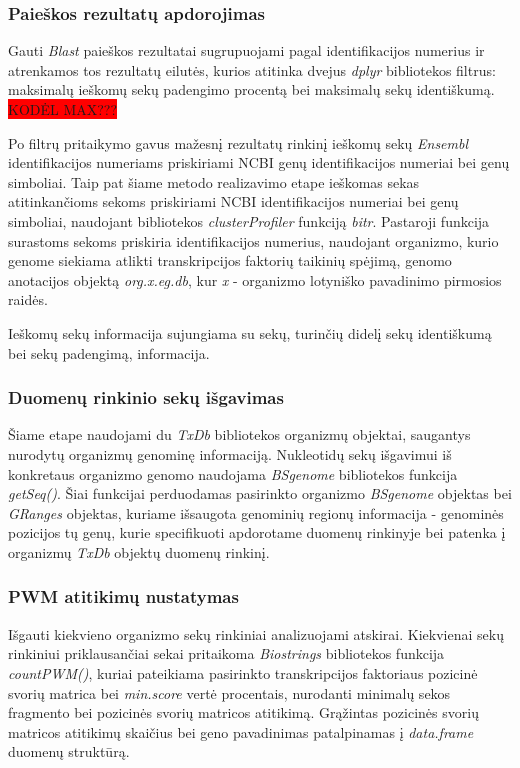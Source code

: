 \documentclass[12pt]{article}
\begin{document}
\subsubsection{Paieškos rezultatų apdorojimas}
Gauti \emph{Blast} paieškos rezultatai sugrupuojami pagal identifikacijos
numerius ir atrenkamos tos rezultatų eilutės, kurios atitinka dvejus
\emph{dplyr} bibliotekos filtrus: maksimalų ieškomų sekų padengimo procentą bei
maksimalų sekų identiškumą. \colorbox{red}{KODĖL MAX???}

Po filtrų pritaikymo gavus mažesnį rezultatų rinkinį ieškomų sekų \emph{Ensembl}
identifikacijos numeriams priskiriami NCBI genų identifikacijos numeriai bei
genų simboliai. Taip pat šiame metodo realizavimo etape ieškomas sekas
atitinkančioms sekoms priskiriami NCBI identifikacijos numeriai bei genų
simboliai, naudojant bibliotekos \emph{clusterProfiler} \cite{CLUSTERPROFILER}
funkciją \emph{bitr}. Pastaroji funkcija surastoms sekoms priskiria
identifikacijos numerius, naudojant organizmo, kurio genome siekiama atlikti
transkripcijos faktorių taikinių spėjimą, genomo anotacijos objektą
\emph{org.x.eg.db}, kur \emph{x} - organizmo lotyniško pavadinimo pirmosios
raidės.

Ieškomų sekų informacija sujungiama su sekų, turinčių didelį sekų identiškumą
bei sekų padengimą, informacija.

\subsubsection{Duomenų rinkinio sekų išgavimas}
Šiame etape naudojami du \emph{TxDb} bibliotekos organizmų objektai,
saugantys nurodytų or\-ga\-niz\-mų genominę informaciją. Nukleotidų sekų
išgavimui iš konkretaus organizmo genomo naudojama \emph{BSgenome} bibliotekos
funkcija \emph{getSeq()}. Šiai funkcijai perduodamas pasirinkto organizmo
\emph{BSgenome} objektas bei \emph{GRanges} objektas, kuriame išsaugota
genominių regionų informacija - genominės pozicijos tų genų, kurie specifikuoti
apdorotame duomenų rinkinyje bei patenka į organizmų \emph{TxDb} objektų duomenų
rinkinį.

\newpage

\subsubsection{PWM atitikimų nustatymas}
Išgauti kiekvieno organizmo sekų rinkiniai analizuojami atskirai. Kiekvienai
sekų rinkiniui priklausančiai sekai pritaikoma
\emph{Biostrings} \cite{BIOSTRINGS} bibliotekos
funkcija \emph{countPWM()}, kuriai pateikiama pasirinkto transkripcijos
faktoriaus pozicinė svorių matrica bei \emph{min.score} vertė procentais,
nurodanti minimalų sekos fragmento bei pozicinės svorių matricos atitikimą.
Grąžintas pozicinės svorių matricos atitikimų skaičius bei geno pavadinimas
patalpinamas į \emph{data.frame} duomenų struktūrą.
\end{document}
